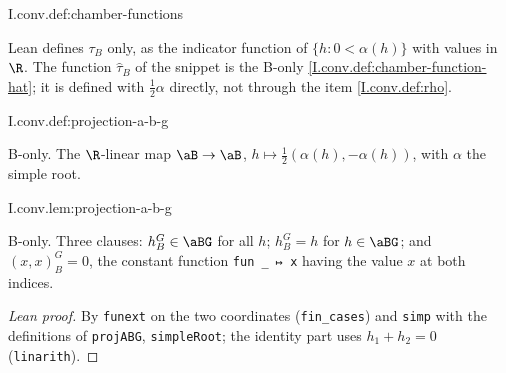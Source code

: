 \begin{definition}
\end{definition}
\begin{tfformal}{I.conv.def:chamber-functions}
\begin{tffidelity}
Lean defines $\tau_B$ only, as the indicator function of $\{h:0<\alpha(h)\}$ with values in $\R$. The function $\hat\tau_B$ of the snippet is the B-only \cref{I.conv.def:chamber-function-hat}; it is defined with $\frac12\alpha$ directly, not through the item \cref{I.conv.def:rho}.
\end{tffidelity}
\end{tfformal}

\begin{definition}
\bonly
{}
\end{definition}
\begin{tfformal}{I.conv.def:projection-a-b-g}
\begin{tffidelity}
B-only. The $\R$-linear map $\aB\to\aB$, $h\mapsto\frac12(\alpha(h),-\alpha(h))$, with $\alpha$ the simple root.
\end{tffidelity}
\end{tfformal}

\begin{lemma}
\bonly
{}
\end{lemma}
\begin{tfformal}{I.conv.lem:projection-a-b-g}
\begin{tffidelity}
B-only. Three clauses: $h_B^G\in\aBG$ for all $h$; $h_B^G=h$ for $h\in\aBG$; and $(x,x)_B^G=0$, the constant function \texttt{fun \_ ↦ x} having the value $x$ at both indices.
\end{tffidelity}
\end{tfformal}
\begin{proof}[Lean proof]
By \texttt{funext} on the two coordinates (\texttt{fin\_cases}) and \texttt{simp} with the definitions of \texttt{projABG}, \texttt{simpleRoot}; the identity part uses $h_1+h_2=0$ (\texttt{linarith}).
\end{proof}

